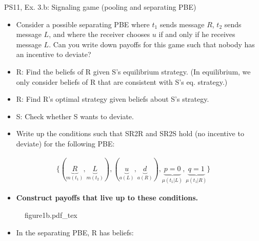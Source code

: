 \begin{frame}{PS11, Ex. 3.b: Signaling game (pooling and separating PBE)}
    \begin{itemize}
        \item[(b)] Consider a possible separating PBE where $t_1$ sends message $R$, $t_2$ sends message $L$, and where the receiver chooses $u$ if and only if he receives message $L$. Can you write down payoffs for this game such that nobody has an incentive to deviate?
    \end{itemize} \vspace{-8pt}
    \begin{multicols}{2}
      \begin{itemize}
        \item[SR3:] R: Find the beliefs of R given S's equilibrium strategy. (In equilibrium, we only consider beliefs of R that are consistent with S's eq. strategy.)
        \item[SR2R:] R: Find R's optimal strategy given beliefs about S's strategy.
        \item[SR2S:] S: Check whether S wants to deviate.
        \item[PBE:]  Write up the conditions such that SR2R and SR2S hold (no incentive to deviate) for the following PBE:
      \end{itemize}\vspace{-14pt}
      \begin{align*}
        \{(\underbrace{R}_{m(t_1)},\underbrace{L}_{m(t_2)}),(\underbrace{u}_{a(L)},\underbrace{d}_{a(R)}),\underbrace{p=0}_{\mu(t_1|L)},\underbrace{q=1}_{\mu(t_1|R)}\}
      \end{align*}\vspace{-12pt}
      \begin{itemize}
        \item[$\rightarrow$] \textbf{Construct payoffs that live up to these conditions.}
      \end{itemize}
      \vfill\null\columnbreak
      \begin{figure}[!h]
        \center
        \def\svgwidth{\columnwidth}
        {figure1b.pdf_tex}
      \end{figure} \vspace{-8pt}
      \begin{itemize}
        \item[SR3:] In the separating PBE, R has beliefs:\vspace{-10pt}
        \begin{align*}

\end{align*}
\end{itemize}
\end{multicols}
\end{frame}
